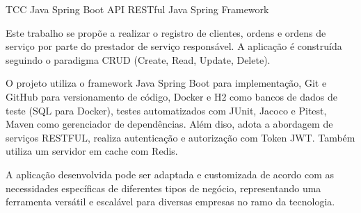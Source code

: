 \palavraschaves
{TCC Java Spring Boot}
{API RESTful}
{Java}
{Spring Framework}




Este trabalho se propõe a realizar o registro de clientes, ordens e ordens de serviço por parte do prestador de serviço responsável. A aplicação é construída seguindo o paradigma CRUD (Create, Read, Update, Delete).

O projeto utiliza o framework Java Spring Boot para implementação, Git e GitHub para versionamento de código, Docker e H2 como bancos de dados de teste (SQL para Docker), testes automatizados com JUnit, Jacoco e Pitest, Maven como gerenciador de dependências. Além diso, adota a abordagem de serviços RESTFUL, realiza autenticação e autorização com Token JWT. Também utiliza um servidor em cache com Redis.

A aplicação desenvolvida pode ser adaptada e customizada de acordo com as necessidades específicas de diferentes tipos de negócio, representando uma ferramenta versátil e escalável para diversas empresas no ramo da tecnologia.\\

\imprimirchaves %


